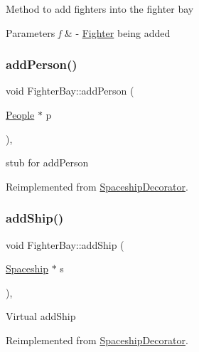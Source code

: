 Method to add fighters into the fighter bay 
\begin{DoxyParams}{Parameters}
{\em f} & -\/ \hyperlink{classFighter}{Fighter} being added \\
\hline
\end{DoxyParams}
\mbox{\label{classFighterBay_aa0777fe7c8a3e6b772fc8bf58a3cb9bb}} 
\subsubsection{\texorpdfstring{add\+Person()}{addPerson()}}
{\footnotesize\ttfamily void Fighter\+Bay\+::add\+Person (\begin{DoxyParamCaption}\item[{\hyperlink{classPeople}{People} $\ast$}]{p }\end{DoxyParamCaption})\hspace{0.3cm}{\ttfamily [inline]}, {\ttfamily [virtual]}}

stub for add\+Person 

Reimplemented from \hyperlink{classSpaceshipDecorator_a6e289d8a65f35b9f223255ae0eaa3b00}{Spaceship\+Decorator}.

\mbox{\label{classFighterBay_a8975b88b27663c76f82168752593ceda}} 
\subsubsection{\texorpdfstring{add\+Ship()}{addShip()}}
{\footnotesize\ttfamily void Fighter\+Bay\+::add\+Ship (\begin{DoxyParamCaption}\item[{\hyperlink{classSpaceship}{Spaceship} $\ast$}]{s }\end{DoxyParamCaption})\hspace{0.3cm}{\ttfamily [inline]}, {\ttfamily [virtual]}}

Virtual add\+Ship 

Reimplemented from \hyperlink{classSpaceshipDecorator_a5ed39419f5fab65dd4af11bf5136f7a4}{Spaceship\+Decorator}.

\mbox{\label{classFighterBay_a925de99777e92d00e51e8aba09d5135c}} 
